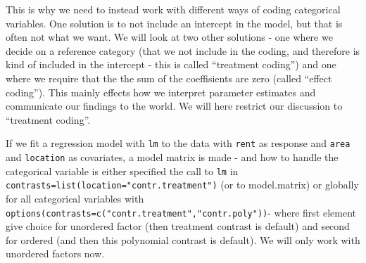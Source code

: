 \documentclass[ignorenonframetext,]{beamer}
\begin{document}
\begin{frame}

This is why we need to instead work with different ways of coding
categorical variables. One solution is to not include an intercept in
the model, but that is often not what we want. We will look at two other
solutions - one where we decide on a reference category (that we not
include in the coding, and therefore is kind of included in the
intercept - this is called ``treatment coding'') and one where we
require that the the sum of the coeffisients are zero (called ``effect
coding''). This mainly effects how we interpret parameter estimates and
communicate our findings to the world. We will here restrict our
discussion to ``treatment coding''.

\end{frame}

\begin{frame}[fragile]

If we fit a regression model with \texttt{lm} to the data with
\texttt{rent} as response and \texttt{area} and \texttt{location} as
covariates, a model matrix is made - and how to handle the categorical
variable is either specified the call to \texttt{lm} in
\texttt{contrasts=list(location="contr.treatment")} (or to model.matrix)
or globally for all categorical variables with
\texttt{options(contrasts=c("contr.treatment","contr.poly"))}- where
first element give choice for unordered factor (then treatment contrast
is default) and second for ordered (and then this polynomial contrast is
default). We will only work with unordered factors now.

\end{frame}
\end{document}
